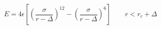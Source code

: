 \documentclass[12pt]{article}
\begin{document}
$$
  E = 4 \epsilon \left[ \left(\frac{\sigma}{r - \Delta}\right)^{12} - 
    \left(\frac{\sigma}{r - \Delta}\right)^6 \right]
    \qquad r < r_c + \Delta
$$
\end{document}
